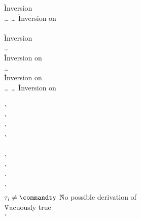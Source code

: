 \begin{description}
\begin{tabbing}
    \` Inversion  \\
  \ldots{}   \ldots
    \` Inversion on  \\
   \\
    \` Inversion  \\
  \ldots{}  \\
    \` Inversion on  \\
   \ldots {} \\
    \` Inversion on  \\
  \ldots{}   \ldots
    \` Inversion on  \\
  \\
    \`  \\
    \`  \\
    \`  \\
    \`  \\
  \\
    \`  \\
    \`  \\
    \`  \\
    \`  \\
  $\tau_i \not= \commandty$
    \` No possible derivation of  \\
    \` Vacuously true \\
    \`  \\
  \end{tabbing}


\end{description}
